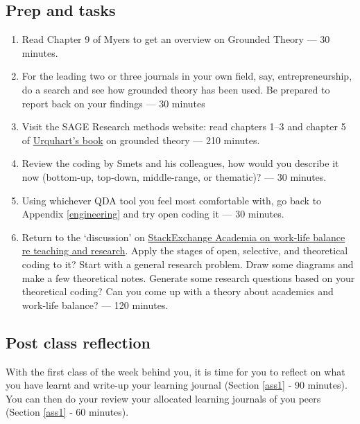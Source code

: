 \documentclass[]{book}
\theoremstyle{definition}
\theoremstyle{definition}
\theoremstyle{definition}
\theoremstyle{remark}
\begin{document}
\hypertarget{prep-and-tasks-8}{%
\subsection*{Prep and tasks}\label{prep-and-tasks-8}}

\begin{enumerate}
\def\labelenumi{\arabic{enumi}.}
\item
  Read Chapter 9 of Myers \autocite*[
  p.~209--220]{myers_2013_qualitativeresearchbusiness} to get an
  overview on Grounded Theory --- 30 minutes.
\item
  For the leading two or three journals in your own field, say,
  entrepreneurship, do a search and see how grounded theory has been
  used. Be prepared to report back on your findings --- 30 minutes
\item
  Visit the SAGE Research methods website: read chapters 1--3 and
  chapter 5 of
  \href{\%5Bhttp://methods.sagepub.com/book/grounded-theory-for-qualitative-research}{Urquhart's
  book} \autocite{urquhart_2017_groundedtheoryqualitative} on grounded
  theory --- 210 minutes.
\item
  Review the coding by Smets and his colleagues, how would you describe
  it now (bottom-up, top-down, middle-range, or thematic)? --- 30
  minutes.
\item
  Using whichever QDA tool you feel most comfortable with, go back to
  Appendix \ref{engineering} and try open coding it --- 30 minutes.
\item
  Return to the `discussion' on
  \href{https://academia.stackexchange.com/questions/89362/how-do-academics-with-teaching-responsibilities-etc-find-the-time-to-do-resear}{StackExchange
  Academia on work-life balance re teaching and research}. Apply the
  stages of open, selective, and theoretical coding to it? Start with a
  general research problem. Draw some diagrams and make a few
  theoretical notes. Generate some research questions based on your
  theoretical coding? Can you come up with a theory about academics and
  work-life balance? --- 120 minutes.
\end{enumerate}

\hypertarget{post-class-reflection-8}{%
\subsection{Post class reflection}\label{post-class-reflection-8}}

With the first class of the week behind you, it is time for you to
reflect on what you have learnt and write-up your learning journal
(Section \ref{ass1} ‐ 90 minutes). You can then do your review your
allocated learning journals of you peers (Section \ref{ass1} ‐ 60
minutes).
\end{document}
